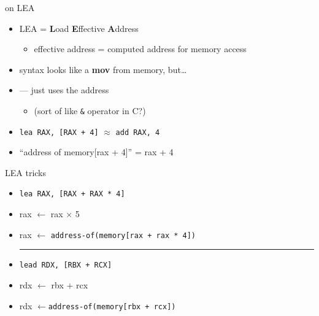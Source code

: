 \begin{frame}[fragile,label=LEA]{on LEA}
    \begin{itemize}
        \item LEA = \textbf{L}oad \textbf{E}ffective \textbf{A}ddress
        \begin{itemize}
            \item effective address = computed address for memory access
        \end{itemize}
    \item syntax looks like a \textbf{mov} from memory, but\ldots
    \item {} --- just uses the address
        \begin{itemize}
            \item (sort of like {\tt \&} operator in C?)
        \end{itemize}
    \item {}\lstinline|lea RAX, [RAX + 4]| $\approx$ \lstinline|add RAX, 4|
    \item<2-> ``address of memory[rax + 4]'' = rax + 4
    \end{itemize}
\end{frame}

\begin{frame}[fragile,label=LEATricks]{LEA tricks}
    \begin{itemize}
    \item {}\lstinline|lea RAX, [RAX + RAX * 4]|
    \item rax $\leftarrow$ rax $\times$ 5
    \item rax $\leftarrow$ {\tt address-of(memory[rax + rax * 4])}
    \vspace{.5cm}
            \hrule
    \vspace{.5cm}
    \item {}\lstinline|lead RDX, [RBX + RCX]|
    \item rdx $\leftarrow$ rbx $+$ rcx
    \item rdx $\leftarrow${\tt address-of(memory[rbx + rcx])}
    \end{itemize}
\end{frame}
